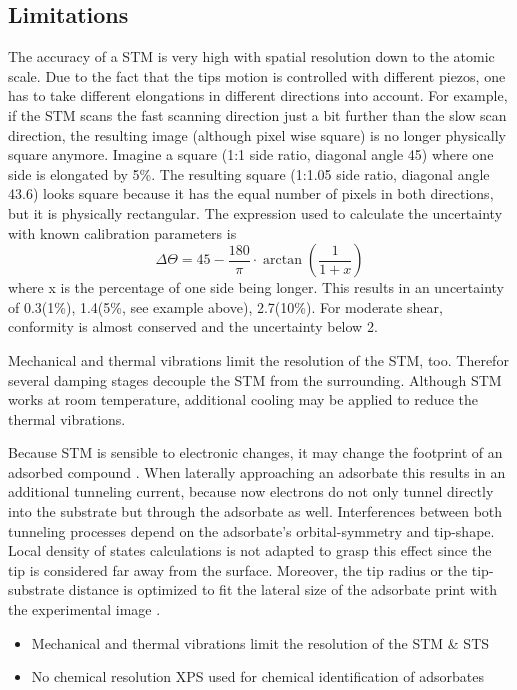 \subsection{Limitations}The accuracy of a STM is very high with spatial resolution down to the atomic scale. Due to the fact that the tips motion is controlled with different piezos, one has to take different elongations in different directions into account. For example, if the STM scans the fast scanning direction just a bit further than the slow scan direction, the resulting image (although pixel wise square) is no longer physically square anymore. Imagine a square (1:1 side ratio, diagonal angle 45\textdegree) where one side is elongated by 5\%. The resulting square (1:1.05 side ratio, diagonal angle 43.6\textdegree) looks square because it has the equal number of pixels in both directions, but it is physically rectangular. The expression used to calculate the uncertainty with known calibration parameters is
$$\Delta \Theta = 45 - \frac{180}{\pi}\cdot\arctan(\frac{1}{1+x})$$ where x is the percentage of one side being longer. This results in an uncertainty of 0.3\textdegree(1\%), 1.4\textdegree(5\%, see example above), 2.7\textdegree(10\%). For moderate shear, conformity is almost conserved and the uncertainty below 2\textdegree.

Mechanical and thermal vibrations limit the resolution of the STM, too. Therefor several damping stages decouple the STM from the surrounding. Although STM works at room temperature, additional cooling may be applied to reduce the thermal vibrations.

Because STM is sensible to electronic changes, it may change the footprint of an adsorbed compound \cite{sautet_interpretation_1992}. When laterally approaching an adsorbate this results in an additional tunneling current, because now electrons do not only tunnel directly into the substrate but through the adsorbate as well. Interferences between both tunneling processes depend on the adsorbate's orbital-symmetry and tip-shape. Local density of states calculations \cite{tersoff_theory_1985, lang_theory_1986, eigler_imaging_1991} is not adapted to grasp this effect since the tip is considered far away from the surface. Moreover, the tip radius or the tip-substrate distance is optimized to fit the lateral size of the adsorbate print with the experimental image \cite{tersoff_theory_1985, eigler_imaging_1991}.

\begin{itemize}
	\item Mechanical and thermal vibrations limit the resolution of the STM \& STS
	\item No chemical resolution
	\subitem XPS used for chemical identification of adsorbates
\end{itemize}


